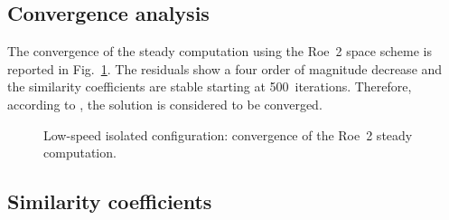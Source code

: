 
\subsection{Convergence analysis}
\label{sub:dream_ls_conv_coeff}

The convergence of the steady computation using the Roe~2 space scheme
is reported in Fig.~\ref{fig:dream_ls_convergence_roe2}. The residuals
show a four order of magnitude decrease and the similarity
coefficients are stable starting at 500~iterations.
Therefore, according to \citet{Casey2000}, the
solution is considered to be converged.
\begin{figure}[htp]
  \centering
  \caption{Low-speed isolated configuration: convergence of the Roe~2 steady
  computation.}
  \label{fig:dream_ls_convergence_roe2}
\end{figure}

\subsection{Similarity coefficients}
\label{sub:dream_ls_sim_coeff}

